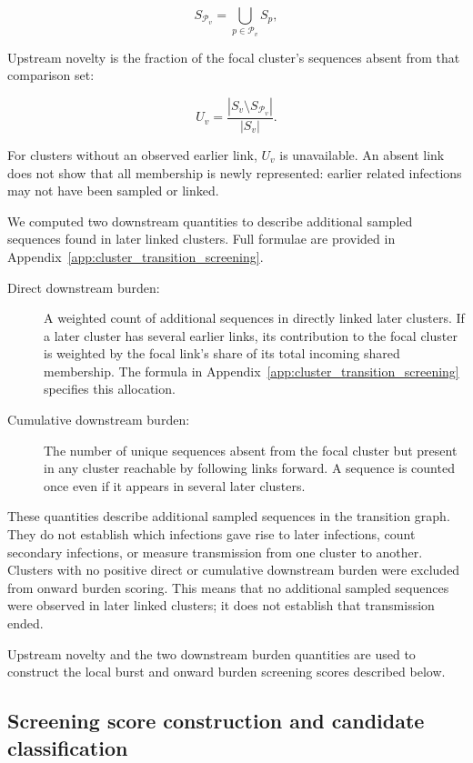 \nopagebreak[4]
\[
    S_{\mathcal{P}_v}=\bigcup_{p\in\mathcal{P}_v} S_p,
\]

Upstream novelty is the fraction of the focal cluster's sequences absent from that comparison set:

\nopagebreak[4]
\[
    U_v=\frac{|S_v\setminus S_{\mathcal{P}_v}|}{|S_v|}.
\]

For clusters without an observed earlier link, $U_v$ is unavailable. An absent link does not show that all membership is newly represented: earlier related infections may not have been sampled or linked.

We computed two downstream quantities to describe additional sampled sequences found in later linked clusters. Full formulae are provided in Appendix~\ref{app:cluster_transition_screening}.

\begin{description}
    \item[Direct downstream burden:] A weighted count of additional sequences in directly linked later clusters. If a later cluster has several earlier links, its contribution to the focal cluster is weighted by the focal link's share of its total incoming shared membership. The formula in Appendix~\ref{app:cluster_transition_screening} specifies this allocation.

    \item[Cumulative downstream burden:] The number of unique sequences absent from the focal cluster but present in any cluster reachable by following links forward. A sequence is counted once even if it appears in several later clusters.
\end{description}

These quantities describe additional sampled sequences in the transition graph. They do not establish which infections gave rise to later infections, count secondary infections, or measure transmission from one cluster to another. Clusters with no positive direct or cumulative downstream burden were excluded from onward burden scoring. This means that no additional sampled sequences were observed in later linked clusters; it does not establish that transmission ended.

Upstream novelty and the two downstream burden quantities are used to construct the local burst and onward burden screening scores described below.

\subsection{Screening score construction and candidate classification}\label{sec:ch5_screening_score}

